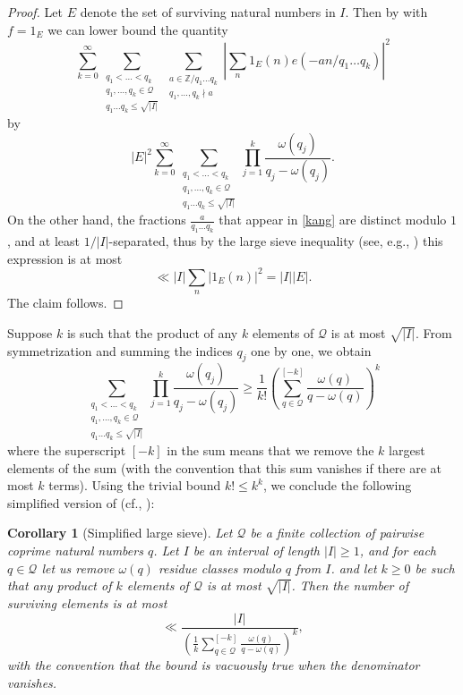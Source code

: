 \documentclass[12pt]{amsart}
\newtheorem{corollary}[theorem]{Corollary}
\newcommand{\Z}{\mathbb{Z}}
\begin{document}
\begin{proof}  Let $E$ denote the set of surviving natural numbers in $I$.  Then by  with $f=1_E$ we can lower bound the quantity
\begin{equation}\label{kang}
\sum_{k=0}^\infty \sum_{\substack{q_1<\dots<q_k\\q_1,\dots,q_k \in {\mathcal Q}\\q_1 \dots q_k \leq \sqrt{|I|}}}
\sum_{\substack{a \in \Z/q_1 \dots q_k\\q_1,\dots,q_k \nmid a}} |\sum_n 1_E(n) e(-an/q_1 \dots q_k)|^2
\end{equation}
by
$$
|E|^2 \sum_{k=0}^\infty \sum_{\substack{q_1<\dots<q_k\\q_1,\dots,q_k \in {\mathcal Q}\\q_1 \dots q_k \leq \sqrt{|I|}}}
\prod_{j=1}^k \frac{\omega(q_j)}{q_j - \omega(q_j)}.$$
On the other hand, the fractions $\frac{a}{q_1 \dots q_k}$ that appear in \eqref{kang} are distinct modulo $1$, and at least $1/|I|$-separated, thus by the large sieve inequality (see, e.g., \cite[Theorem 1]{montgomery-vaughan}) this expression is at most
$$ \ll |I| \sum_n |1_E(n)|^2 = |I| |E|.$$
The claim follows.
\end{proof}

Suppose $k$ is such that the product of any $k$ elements of ${\mathcal Q}$ is at most $\sqrt{|I|}$.  From symmetrization and summing the indices $q_j$ one by one, we obtain
$$
\sum_{\substack{q_1<\dots<q_k\\q_1,\dots,q_k \in {\mathcal Q}\\q_1 \dots q_k \leq \sqrt{|I|}}}
\prod_{j=1}^k \frac{\omega(q_j)}{q_j - \omega(q_j)} \geq \frac{1}{k!} \left( \sum_{q \in {\mathcal Q}}^{[-k]} \frac{\omega(q)}{q - \omega(q)}\right)^k$$
where the superscript $[-k]$ in the sum means that we remove the $k$ largest elements of the sum (with the convention that this sum vanishes if there are at most $k$ terms).  Using the trivial bound $k! \leq k^k$, we conclude the following simplified version of  (cf., \cite[Theorem 3.1]{vaughan}):

\begin{corollary}[Simplified large sieve]\label{large-sieve} Let ${\mathcal Q}$ be a finite collection of pairwise coprime natural numbers $q$.  Let $I$ be an interval of length $|I| \geq 1$, and for each $q \in {\mathcal Q}$ let us remove $\omega(q)$ residue classes modulo $q$ from $I$.  and let $k \geq 0$ be such that any product of $k$ elements of ${\mathcal Q}$ is at most $\sqrt{|I|}$.  Then the number of surviving elements is at most
$$ \ll \frac{|I|}{\left( \frac{1}{k}\sum_{q \in {\mathcal Q}}^{[-k]} \frac{\omega(q)}{q - \omega(q)}\right)^k},$$
with the convention that the bound is vacuously true when the denominator vanishes.
\end{corollary}
\end{document}
